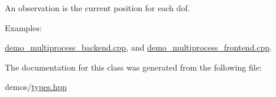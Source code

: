 An observation is the current position for each dof. \begin{Desc}
\item[Examples\+: ]\par
\hyperlink{demo_multiprocess_backend_8cpp-example}{demo\+\_\+multiprocess\+\_\+backend.\+cpp}, and \hyperlink{demo_multiprocess_frontend_8cpp-example}{demo\+\_\+multiprocess\+\_\+frontend.\+cpp}.\end{Desc}


The documentation for this class was generated from the following file\+:\begin{DoxyCompactItemize}
\item 
demos/\hyperlink{types_8hpp}{types.\+hpp}\end{DoxyCompactItemize}
